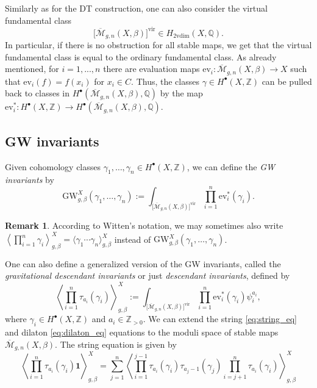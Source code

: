\documentclass[11pt,colorinlistoftodos]{amsart}
\numberwithin{equation}{subsection}
\theoremstyle{plain}
\theoremstyle{definition}
\newtheorem{rem}[thm]{Remark}
\theoremstyle{remark}
\newcommand{\Z}{\mathbb{Z}}
\newcommand{\Q}{\mathbb{Q}}
\newcommand{\calM}{\mathcal{M}}
\begin{document}
Similarly as for the DT construction, one can also consider the virtual fundamental class
\[
\Big[\overline{\calM}_{g,n}(X,\beta)\Big]^\mathrm{vir}\in H_{2\mathrm{vdim}}(X,\mathbb{Q}).
\]
In particular, if there is no obstruction for all stable maps, we get that the virtual fundamental class is equal to the ordinary fundamental class. As already mentioned, for $i=1,...,n$ there are evaluation maps $\mathrm{ev}_i\colon \overline{\calM}_{g,n}(X,\beta)\to X$ such that $\mathrm{ev}_i(f)=f(x_i)$ for $x_i\in C$. Thus, the classes $\gamma\in H^\bullet(X,\Z)$ can be pulled back to classes in $H^\bullet(\overline{\calM}_{g,n}(X,\beta),\Q)$ by the map $\mathrm{ev}_i^*\colon H^\bullet(X,\Z)\to H^\bullet(\overline{\calM}_{g,n}(X,\beta),\Q)$.

\subsection{GW invariants}
Given cohomology classes $\gamma_1,\ldots, \gamma_n\in H^\bullet(X,\Z)$, we can define the \emph{GW invariants} by 
\begin{equation}                    
\label{eq:GW_invariants}
\mathrm{GW}_{g,\beta}^X(\gamma_1,\ldots,\gamma_n):=\int_{\big[\overline{\calM}_{g,n}(X,\beta)\big]^\mathrm{vir}}\prod_{i=1}^n\mathrm{ev}^*_i(\gamma_i).
\end{equation}
\begin{rem}
According to Witten's notation, we may sometimes also write $\left\langle \prod_{i=1}^n\gamma_i\right\rangle^X_{g,\beta}=\langle\gamma_1\dotsm\gamma_n\rangle_{g,\beta}^X$ instead of $\mathrm{GW}_{g,\beta}^X(\gamma_1,\ldots,\gamma_n)$. 
\end{rem}
One can also define a generalized version of the GW invariants, called the \emph{gravitational descendant invariants} or just \emph{descendant invariants}, defined by 
\begin{equation}
    \label{eq:gd_invariants}
    \left\langle\prod_{i=1}^n\tau_{a_i}(\gamma_i)\right\rangle_{g,\beta}^X:=\int_{\big[\overline{\calM}_{g,n}(X,\beta)\big]^\mathrm{vir}}\prod_{i=1}^n\mathrm{ev}^*_i(\gamma_i) \psi_{i}^{a_i},
\end{equation}
where $\gamma_i\in H^\bullet(X,\Z)$ and $a_i\in\mathbb{Z}_{>0}$.
We can extend the string \eqref{eq:string_eq} and dilaton \eqref{eq:dilaton_eq} equations to the moduli space of stable maps $\overline{\calM}_{g,n}(X,\beta)$. The string equation is given by 
\begin{equation}
    \label{eq:string_eq2}
    \left\langle\prod_{i=1}^n\tau_{a_i}(\gamma_i)\boldsymbol{1}\right\rangle_{g,\beta}^X
    =\sum_{j=1}^n\left\langle\prod_{i=1}^{j-1}\tau_{a_i}(\gamma_i)\tau_{a_j-1}(\gamma_j)\prod_{i=j+1}^n\tau_{a_{i}}(\gamma_{i})\right\rangle_{g,\beta}^X
\end{equation}
\end{document}
